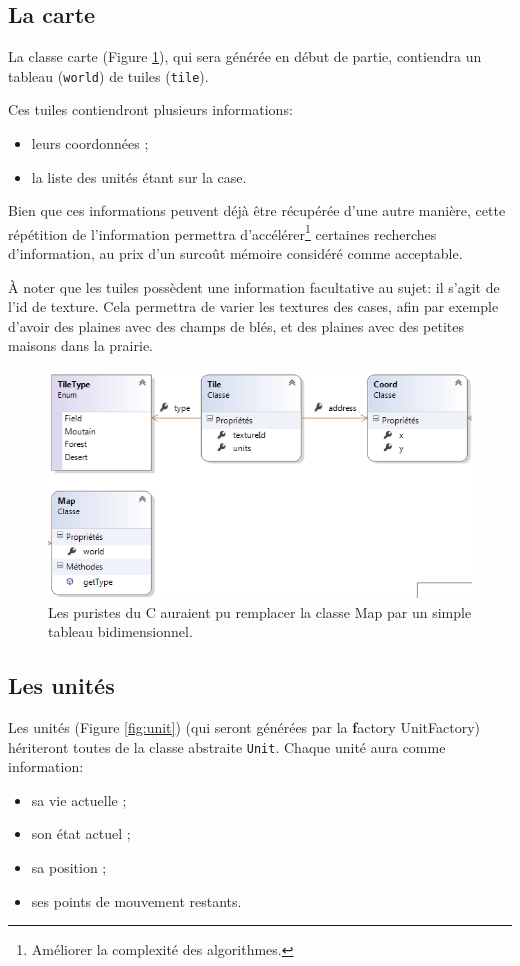 	\subsection{La carte}
		\label{sec:carte}
		La classe carte (Figure \ref{fig:classe_map}), qui sera générée en début de partie, contiendra un tableau (\verb|world|) de tuiles (\verb|tile|).

		Ces tuiles contiendront plusieurs informations:
		\begin{itemize}
			\item leurs coordonnées ;
			\item la liste des unités étant sur la case.
		\end{itemize}

		Bien que ces informations peuvent déjà être récupérée d'une autre manière, cette répétition de l'information permettra d'accélérer\footnote{Améliorer la complexité des algorithmes.} certaines recherches d'information, au prix d'un surcoût mémoire considéré comme acceptable.

		\`A noter que les tuiles possèdent une information facultative au sujet: il s'agit de l'id de texture. Cela permettra de varier les textures des cases, afin par exemple d'avoir des plaines avec des champs de blés, et des plaines avec des petites maisons dans la prairie.

		\begin{figure}[h!]
			\begin{center}
				\includegraphics[width=1\textwidth]{figure/classe_map.png}
			\end{center}
			\caption{Les puristes du C auraient pu remplacer la classe Map par un simple tableau bidimensionnel.}
			\label{fig:classe_map}
		\end{figure}

	\subsection{Les unités}
		\label{sec:units}
		Les unités (Figure \ref{fig:unit}) (qui seront générées par la {\textbf factory} UnitFactory) hériteront toutes de la classe abstraite \verb|Unit|.
		Chaque unité aura comme information:
		\begin{itemize}
			\item sa vie actuelle ;
			\item son état actuel ;
			\item sa position ;
			\item ses points de mouvement restants.
		\end{itemize}

